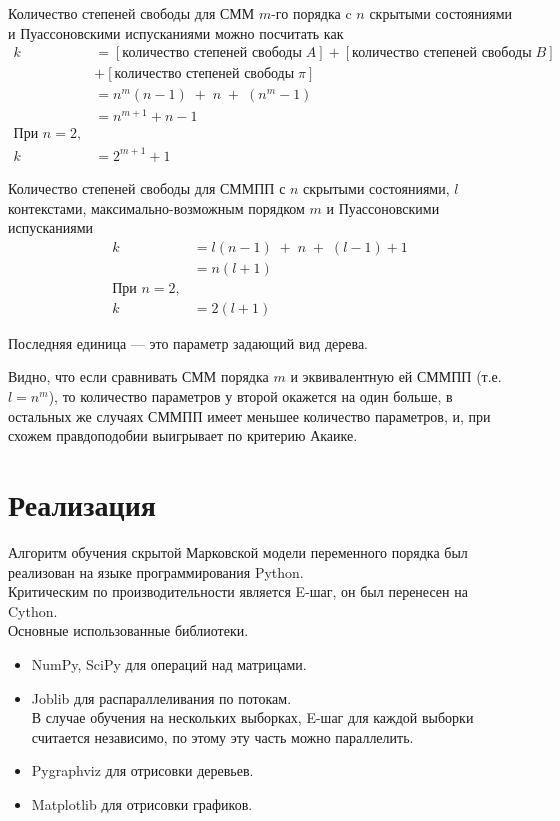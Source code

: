\documentclass{matmex-diploma-custom}
\begin{document}
Количество степеней свободы для СММ $ m $-го порядка c $ n $ скрытыми состояниями и Пуассоновскими испусканиями можно посчитать как
\begin{align*}
k &= [\text{количество степеней свободы} \; A ] 
+ [\text{количество степеней свободы} \; B ]
\\&+ [\text{количество степеней свободы} \; \pi ]
\\ &= n^m(n-1)\;+\;n\;+\;(n^m-1) \\&= n^{m+1} + n - 1
\\
\text{При } n=2,
\\k &= 2^{m+1} + 1
\end{align*}

Количество степеней свободы для СММПП с $ n $ скрытыми состояниями, $ l $ контекстами, максимально-возможным порядком $ m $ и Пуассоновскими испусканиями 
\begin{align*}
k &=  l(n-1)\;+\;n\;+\;(l-1) + 1 
\\&=  n(l+1) 
\\
\text{При } n=2,
\\k &= 2(l+1)
\end{align*}

Последняя единица --- это параметр задающий вид дерева.

Видно, что если сравнивать СММ порядка $m$ и эквивалентную ей СММПП (т.е. $l = n^{m}$), то количество параметров у второй окажется на один больше, в остальных же случаях СММПП имеет меньшее количество параметров, и, при схожем правдоподобии выигрывает по критерию Акаике.


\section{Реализация}
Алгоритм обучения скрытой Марковской модели переменного порядка был реализован на языке программирования Python. 
\\
Критическим по производительности является E-шаг, он был перенесен на Cython.
\\
Основные использованные библиотеки.
\begin{itemize}
\item
NumPy, SciPy для операций над матрицами.
\item
Joblib для распараллеливания по потокам.
\\
В случае обучения на нескольких выборках, E-шаг для каждой выборки считается независимо, по этому эту часть можно параллелить.
\item
Pygraphviz для отрисовки деревьев. 
\item
Matplotlib для отрисовки графиков.
\end{itemize}
\end{document}
